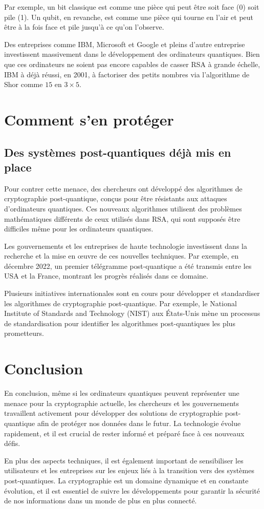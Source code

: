 \documentclass[a4paper,12pt]{article}
\begin{document}
Par exemple, un bit classique est comme une pièce qui peut être soit face (0) soit pile (1). Un qubit, en revanche, est comme une pièce qui tourne en l'air et peut être à la fois face et pile jusqu'à ce qu'on l'observe.

Des entreprises comme IBM, Microsoft et Google et pleins d'autre entreprise investissent massivement dans le développement des ordinateurs quantiques. Bien que ces ordinateurs ne soient pas encore capables de casser RSA à grande échelle, IBM à déjà réussi, en 2001, à factoriser des petits nombres via l'algorithme de Shor comme \(15\) en \(3 \times 5\).

\section{Comment s'en protéger}

\subsection{Des systèmes post-quantiques déjà mis en place}
Pour contrer cette menace, des chercheurs ont développé des algorithmes de cryptographie post-quantique, conçus pour être résistants aux attaques d'ordinateurs quantiques. Ces nouveaux algorithmes utilisent des problèmes mathématiques différents de ceux utilisés dans RSA, qui sont supposés être difficiles même pour les ordinateurs quantiques.

Les gouvernements et les entreprises de haute technologie investissent dans la recherche et la mise en œuvre de ces nouvelles techniques. Par exemple, en décembre 2022, un premier télégramme post-quantique a été transmis entre les USA et la France, montrant les progrès réalisés dans ce domaine.

Plusieurs initiatives internationales sont en cours pour développer et standardiser les algorithmes de cryptographie post-quantique. Par exemple, le National Institute of Standards and Technology (NIST) aux États-Unis mène un processus de standardisation pour identifier les algorithmes post-quantiques les plus prometteurs. 

\section{Conclusion}
En conclusion, même si les ordinateurs quantiques peuvent représenter une menace pour la cryptographie actuelle, les chercheurs et les gouvernements travaillent activement pour développer des solutions de cryptographie post-quantique afin de protéger nos données dans le futur. La technologie évolue rapidement, et il est crucial de rester informé et préparé face à ces nouveaux défis. 

En plus des aspects techniques, il est également important de sensibiliser les utilisateurs et les entreprises sur les enjeux liés à la transition vers des systèmes post-quantiques. La cryptographie est un domaine dynamique et en constante évolution, et il est essentiel de suivre les développements pour garantir la sécurité de nos informations dans un monde de plus en plus connecté.

\listoffigures
\end{document}
